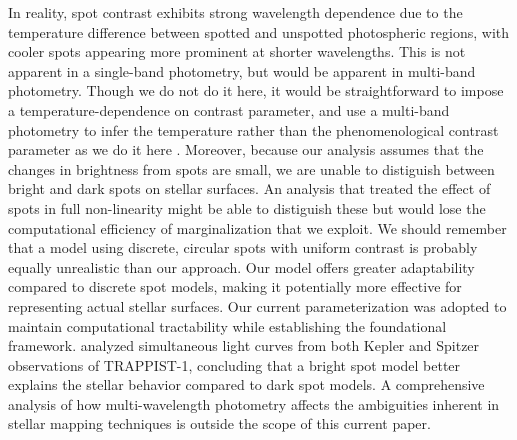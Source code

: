 \documentclass[twocolumn]{aastex631}
\newcommand{\sabinasays}[1]{{\color{purple}#1}}
\begin{document}
\sabinasays{In reality, spot contrast exhibits 
strong wavelength dependence due to the temperature difference between spotted and unspotted photospheric 
regions, with cooler spots appearing more prominent at shorter wavelengths. This is not apparent in a single-band photometry, but would be apparent in multi-band photometry. Though we do not do it here, it would be straightforward to impose a temperature-dependence on contrast parameter, and use a multi-band photometry to infer the temperature rather than the phenomenological contrast parameter as we do it here  \citep[e.g.,][]{Herrero2016,Juvan2018}. Moreover, because our analysis assumes that the changes in brightness from spots are small, we are unable to distiguish between bright and dark spots on stellar surfaces. An analysis that treated the effect of spots in full non-linearity might be able to distiguish these but would lose the computational efficiency of marginalization that we exploit.
We should remember that a model using discrete, circular spots with uniform contrast is probably equally unrealistic than our approach. Our model offers greater adaptability compared to discrete spot models, making it potentially more effective for representing actual stellar surfaces.
Our current parameterization was adopted to maintain computational tractability while establishing the 
foundational framework. 
\cite{Morris2018} analyzed simultaneous light curves from both Kepler and Spitzer observations of TRAPPIST-1, concluding that a bright spot model better explains the stellar behavior compared to dark spot models. A comprehensive analysis of how multi-wavelength photometry affects the ambiguities inherent in stellar mapping techniques is outside the scope of this current paper.}
\end{document}
